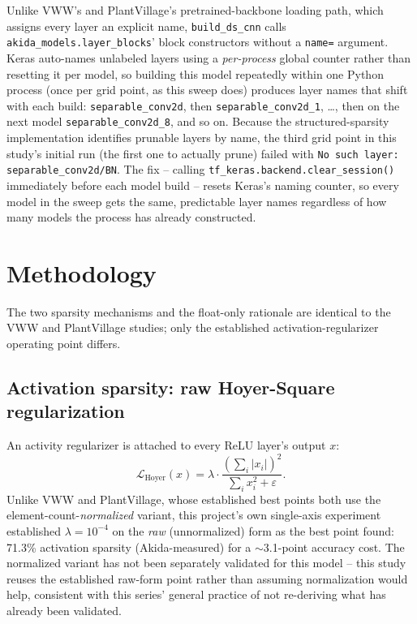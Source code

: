\documentclass[11pt]{article}
\newcommand{\code}[1]{\texttt{#1}}
\begin{document}
Unlike VWW's and PlantVillage's pretrained-backbone loading path, which assigns every layer an explicit name, \code{build\_ds\_cnn} calls \code{akida\_models.layer\_blocks}' block constructors without a \code{name=} argument. Keras auto-names unlabeled layers using a \emph{per-process} global counter rather than resetting it per model, so building this model repeatedly within one Python process (once per grid point, as this sweep does) produces layer names that shift with each build: \code{separable\_conv2d}, then \code{separable\_conv2d\_1}, \ldots, then on the next model \code{separable\_conv2d\_8}, and so on. Because the structured-sparsity implementation identifies prunable layers by name, the third grid point in this study's initial run (the first one to actually prune) failed with \code{No such layer: separable\_conv2d/BN}. The fix -- calling \code{tf\_keras.backend.clear\_session()} immediately before each model build -- resets Keras's naming counter, so every model in the sweep gets the same, predictable layer names regardless of how many models the process has already constructed.

\section{Methodology}

The two sparsity mechanisms and the float-only rationale are identical to the VWW and PlantVillage studies; only the established activation-regularizer operating point differs.

\subsection{Activation sparsity: raw Hoyer-Square regularization}

An activity regularizer is attached to every ReLU layer's output $x$:
\begin{equation}
\mathcal{L}_{\text{Hoyer}}(x) = \lambda \cdot \frac{\left(\sum_i |x_i|\right)^2}{\sum_i x_i^2 + \varepsilon}.
\end{equation}
Unlike VWW and PlantVillage, whose established best points both use the element-count-\emph{normalized} variant, this project's own single-axis experiment established $\lambda=10^{-4}$ on the \emph{raw} (unnormalized) form as the best point found: 71.3\% activation sparsity (Akida-measured) for a $\sim$3.1-point accuracy cost. The normalized variant has not been separately validated for this model -- this study reuses the established raw-form point rather than assuming normalization would help, consistent with this series' general practice of not re-deriving what has already been validated.
\end{document}
